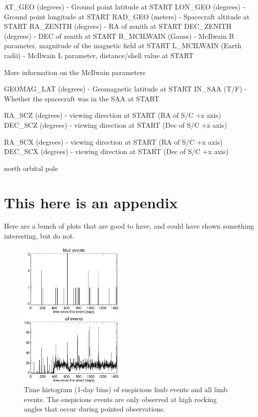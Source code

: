 \documentclass[aps,twocolumn,prd,superscriptaddress,showpacs,nofootinbib,fixfloat]{revtex4}
\begin{document}
AT_GEO (degrees) - Ground point latitude at START
LON_GEO (degrees) - Ground point longitude at START
RAD_GEO (meters) - Spacecraft altitude at START
RA_ZENITH (degrees) - RA of zenith at START
DEC_ZENITH (degrees) - DEC of zenith at START
B_MCILWAIN (Gauss) - McIlwain B parameter, magnitude of the magnetic field at START
L_MCILWAIN (Earth radii) - McIlwain L parameter, distance/shell value at START

    More information on the McIlwain parameters

GEOMAG_LAT (degrees) - Geomagnetic latitude at START
IN_SAA (T/F) - Whether the spacecraft was in the SAA at START

RA_SCZ (degrees) - viewing direction at START (RA of S/C +z axis)
DEC_SCZ (degrees) - viewing direction at START (Dec of S/C +z axis)

RA_SCX (degrees) - viewing direction at START (RA of S/C +x axis)
DEC_SCX (degrees) - viewing direction at START (Dec of S/C +x axis)

 north orbital pole 















\clearpage
\appendix
\section{This here is an appendix}

Here are a bunch of plots that are good to have, and could have shown
something interesting, but do not. 

\begin{figure}[p]
\centering
\includegraphics[width=0.45\textwidth]{plots/timehist.ps}
\caption{Time histogram (1-day bins) of suspicious limb events and all limb
events.  The suspicious events are only observed at high rocking
angles that occur during pointed observations.
}
\label{fig:timehist}
\end{figure}
\end{document}
